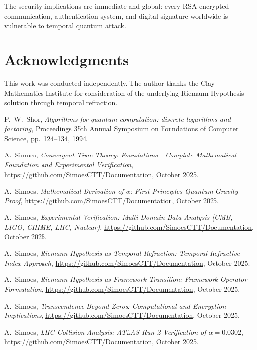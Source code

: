 \documentclass[12pt,a4paper]{article}
\begin{document}
The security implications are immediate and global: every RSA-encrypted communication, authentication system, and digital signature worldwide is vulnerable to temporal quantum attack.

\section*{Acknowledgments}

This work was conducted independently. The author thanks the Clay Mathematics Institute for consideration of the underlying Riemann Hypothesis solution through temporal refraction.

\begin{thebibliography}{9}

P.~W.~Shor,
\textit{Algorithms for quantum computation: discrete logarithms and factoring},
Proceedings 35th Annual Symposium on Foundations of Computer Science,
pp.~124--134, 1994.

A.~Simoes,
\textit{Convergent Time Theory: Foundations - Complete Mathematical Foundation and Experimental Verification},
\url{https://github.com/SimoesCTT/Documentation}, October 2025.

A.~Simoes,
\textit{Mathematical Derivation of $\alpha$: First-Principles Quantum Gravity Proof},
\url{https://github.com/SimoesCTT/Documentation}, October 2025.

A.~Simoes,
\textit{Experimental Verification: Multi-Domain Data Analysis (CMB, LIGO, CHIME, LHC, Nuclear)},
\url{https://github.com/SimoesCTT/Documentation}, October 2025.

A.~Simoes,
\textit{Riemann Hypothesis as Temporal Refraction: Temporal Refractive Index Approach},
\url{https://github.com/SimoesCTT/Documentation}, October 2025.

A.~Simoes,
\textit{Riemann Hypothesis as Framework Transition: Framework Operator Formulation},
\url{https://github.com/SimoesCTT/Documentation}, October 2025.

A.~Simoes,
\textit{Transcendence Beyond Zeros: Computational and Encryption Implications},
\url{https://github.com/SimoesCTT/Documentation}, October 2025.

A.~Simoes,
\textit{LHC Collision Analysis: ATLAS Run-2 Verification of $\alpha=0.0302$},
\url{https://github.com/SimoesCTT/Documentation}, October 2025.


\end{thebibliography}
\end{document}
